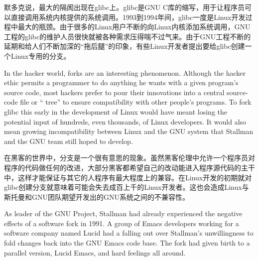 \ifdefined\chs
默多克说，最大的隔阂出现在glibc上。glibc是GNU C库的缩写，用于让程序员可以直接调用系统内核提供的系统调用。1993到1994年间，glibc一度是Linux开发过程中最大的瓶颈。由于很多的Linux用户不断的向Linux内核添加系统调用，GNU工程的glibc的维护人员很快就被各种需求压得喘不过气来。由于GNU工程不断的延期和给人们不断加深的``拖后腿''的印象，有些Linux开发者提出要给glibc创建一个Linux专用的分支。
\fi

\ifdefined\eng
In the hacker world, forks are an interesting phenomenon. Although the hacker ethic permits a programmer to do anything he wants with a given program's source code, most hackers prefer to pour their innovations into a central source-code file or `` tree'' to ensure compatibility with other people's programs. To fork glibc this early in the development of Linux would have meant losing the potential input of hundreds, even thousands, of Linux developers. It would also mean growing incompatibility between Linux and the GNU system that Stallman and the GNU team still hoped to develop.
\fi

\ifdefined\chs
在黑客的世界中，分支是一个很有意思的现象。虽然黑客伦理中允许一个程序员对程序的代码做任何的改进，大部分黑客都希望自己的改动能进入程序源代码的主干中，这样才能保证与其它的人程序有最大程度上的兼容。在Linux开发的初期就对glibc创建分支就意味着可能会失去成百上千的Linux开发者。这也会造成Linux与斯托曼和GNU团队期望开发出的GNU系统之间的不兼容性。
\fi

\ifdefined\eng
As leader of the GNU Project, Stallman had already experienced the negative effects of a software fork in 1991. A group of Emacs developers working for a software company named Lucid had a falling out over Stallman's unwillingness to fold changes back into the GNU Emacs code base. The fork had given birth to a parallel version, Lucid Emacs, and hard feelings all around. 
\fi

